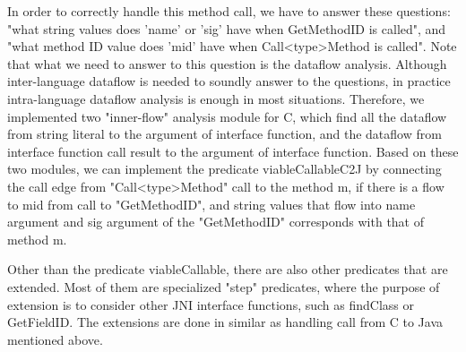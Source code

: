 In order to correctly handle this method call, we have to answer these
questions: "what string values does 'name' or 'sig' have when GetMethodID is
called", and "what method ID value does 'mid' have when Call<type>Method is
called". Note that what we need to answer to this question is the dataflow
analysis. Although inter-language dataflow is needed to soundly answer to the
questions, in practice intra-language dataflow analysis is enough in most
situations. Therefore, we implemented two "inner-flow" analysis module for C,
which find all the dataflow from string literal to the argument of interface
function, and the dataflow from interface function call result to the argument
of interface function. Based on these two modules, we can implement the
predicate viableCallableC2J by connecting the call edge from "Call<type>Method"
call to the method m, if there is a flow to mid from call to "GetMethodID", and
string values that flow into name argument and sig argument of the "GetMethodID"
corresponds with that of method m.

Other than the predicate viableCallable, there are also other predicates that
are extended. Most of them are specialized "step" predicates, where the purpose
of extension is to consider other JNI interface functions, such as
findClass or GetFieldID. The extensions are done in similar as handling
call from C to Java mentioned above.
